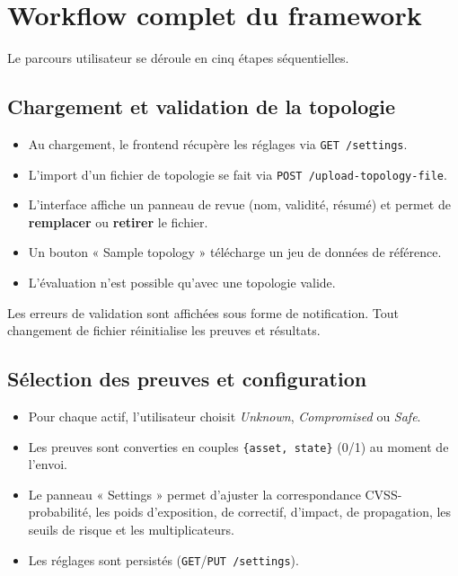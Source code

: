 \documentclass[12pt,a4paper]{article}
\newcommand{\forcereset}[1]{}
\begin{document}
\section{Workflow complet du framework}
\forcereset{6}

Le parcours utilisateur se déroule en cinq étapes séquentielles.

\subsection{Chargement et validation de la topologie}
\forcereset{5}

\begin{itemize}[leftmargin=1.2cm, itemsep=0.2\baselineskip]
    \item Au chargement, le frontend récupère les réglages via \texttt{GET /settings}.
    \item L'import d'un fichier de topologie se fait via \texttt{POST /upload-topology-file}.
    \item L'interface affiche un panneau de revue (nom, validité, résumé) et permet de \textbf{remplacer} ou \textbf{retirer} le fichier.
    \item Un bouton « Sample topology » télécharge un jeu de données de référence.
    \item L'évaluation n'est possible qu'avec une topologie valide.
\end{itemize}

\begin{warningbox}
Les erreurs de validation sont affichées sous forme de notification. Tout changement de fichier réinitialise les preuves et résultats.
\end{warningbox}

\subsection{Sélection des preuves et configuration}
\forcereset{5}

\begin{itemize}[leftmargin=1.2cm, itemsep=0.2\baselineskip]
    \item Pour chaque actif, l'utilisateur choisit \emph{Unknown}, \emph{Compromised} ou \emph{Safe}.
    \item Les preuves sont converties en couples \texttt{\{asset, state\}} (0/1) au moment de l'envoi.
    \item Le panneau « Settings » permet d'ajuster la correspondance CVSS-probabilité, les poids d'exposition, de correctif, d'impact, de propagation, les seuils de risque et les multiplicateurs.
    \item Les réglages sont persistés (\texttt{GET}/\texttt{PUT /settings}).
\end{itemize}
\end{document}
